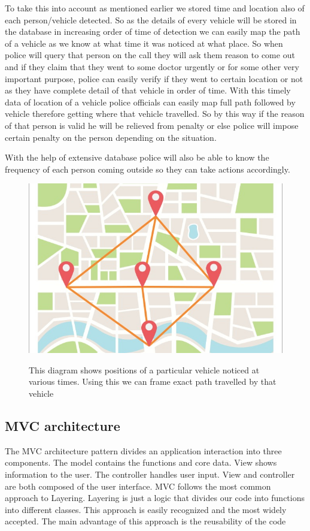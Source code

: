 \documentclass[10pt,twocolumn,letterpaper]{article}
\begin{document}
To take this into account as mentioned earlier we stored time and location also of each person/vehicle detected. So as the details of every vehicle will be stored in the database in increasing order of time of detection we can easily map the path of a vehicle as we know at what time it was noticed at what place. So when police will query that person on the call they will ask them reason to come out and if they claim that they went to some doctor urgently or for some other very important purpose, police can easily verify if they went to certain location or not as they have complete detail of that vehicle in order of time. With this timely data of location of a vehicle police officials can easily map full path followed by vehicle therefore getting where that vehicle travelled. So by this way if the reason of that person is valid he will be relieved from penalty or else police will impose certain penalty on the person depending on the situation.

With the help of extensive database police will also be able to know the frequency of each person coming outside so they can take actions accordingly.

\begin{figure}[!htb]
	\centering\includegraphics[width=\columnwidth]{path.jpeg}\\
	\caption{This diagram shows positions of a particular vehicle noticed at various times. Using this we can frame exact path travelled by that vehicle}\label{path}
\end{figure}


\subsection{MVC architecture}
The MVC architecture pattern  divides an  application interaction  into three  components\cite{mvc}. The model contains the  functions and  core data. View  shows information to the user.  The controller handles  user input. View and controller are both composed of the user interface. MVC follows the most common approach to Layering. Layering is just a logic that divides our code into functions  into different classes. This approach is easily recognized and the most widely accepted. The main advantage of this approach is the reusability of the code
\end{document}
